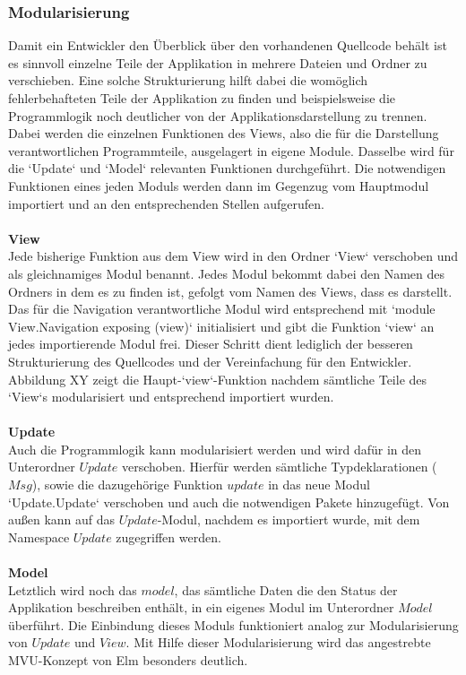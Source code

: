 \subsubsection{Modularisierung}
\label{sec:Modularisierung}
Damit ein Entwickler den Überblick über den vorhandenen Quellcode behält ist es sinnvoll einzelne Teile der Applikation in mehrere Dateien und Ordner zu verschieben. Eine solche Strukturierung hilft dabei die womöglich fehlerbehafteten Teile der Applikation zu finden und beispielsweise die Programmlogik noch deutlicher von der Applikationsdarstellung zu trennen. Dabei werden die einzelnen Funktionen des Views, also die für die Darstellung verantwortlichen Programmteile, ausgelagert in eigene Module. Dasselbe wird für die `Update` und `Model` relevanten Funktionen durchgeführt. Die notwendigen Funktionen eines jeden Moduls werden dann im Gegenzug vom Hauptmodul importiert und an den entsprechenden Stellen aufgerufen.\\\\
\noindent\textbf{View}\\
Jede bisherige Funktion aus dem View wird in den Ordner `View` verschoben und als gleichnamiges Modul benannt. Jedes Modul bekommt dabei den Namen des Ordners in dem es zu finden ist, gefolgt vom Namen des Views, dass es darstellt. Das für die Navigation verantwortliche Modul wird  entsprechend mit `module View.Navigation exposing (view)` initialisiert und gibt die Funktion `view` an jedes importierende Modul frei.
Dieser Schritt dient lediglich der besseren Strukturierung des Quellcodes und der Vereinfachung für den Entwickler. Abbildung XY zeigt die Haupt-`view`-Funktion nachdem sämtliche Teile des `View`s modularisiert und entsprechend importiert wurden.\\\\
\noindent\textbf{Update}\\
Auch die Programmlogik kann modularisiert werden und wird dafür in den Unterordner $Update$ verschoben. Hierfür werden sämtliche Typdeklarationen ($Msg$), sowie die dazugehörige Funktion $update$ in das neue Modul `Update.Update` verschoben und auch die notwendigen Pakete hinzugefügt. Von außen kann auf das $Update$-Modul, nachdem es importiert wurde, mit dem Namespace $Update$ zugegriffen werden.\\\\
\textbf{Model}\\
Letztlich wird noch das $model$, das sämtliche Daten die den Status der Applikation beschreiben enthält, in ein eigenes Modul im Unterordner $Model$ überführt. Die Einbindung dieses Moduls funktioniert analog zur Modularisierung von $Update$ und $View$.
Mit Hilfe dieser Modularisierung wird das angestrebte \ac{MVU}-Konzept von Elm besonders deutlich.

